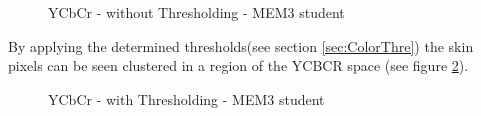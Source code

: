 \documentclass[Bachelorarbeit.tex]{subfiles}
\begin{document}
\begin{figure}[!h]
\centering
{}
\caption{YCbCr - without Thresholding - MEM3 student}\label{YCbCr_tobi_withoutThresholding}
\end{figure}

By applying the determined thresholds(see section \ref{sec:ColorThre}) the skin pixels can be seen clustered in a region of the YCBCR space (see figure \ref{YCbCr_tobi_withThresholding}).

\begin{figure}[!h]
\centering
{}
\caption{YCbCr - with Thresholding - MEM3 student}\label{YCbCr_tobi_withThresholding}
\end{figure}
\end{document}
